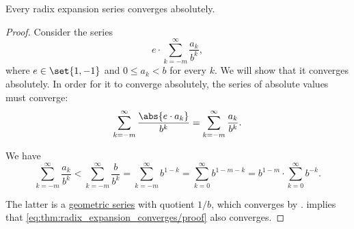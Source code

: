 \begin{proposition}\label{thm:radix_expansion_converges}
  Every radix expansion series converges absolutely.
\end{proposition}
\begin{proof}
  Consider the series
  \begin{equation}\label{eq:thm:radix_expansion_converges/proof}
    e \cdot \sum_{k=-m}^\infty \frac {a_k} {b^k},
  \end{equation}
  where \( e \in \set{ 1, -1 } \) and \( 0 \leq a_k < b \) for every \( k \). We will show that it converges absolutely. In order for it to converge absolutely, the series of absolute values must converge:
  \begin{equation}\label{eq:thm:radix_expansion_converges/absolute}
    \sum_{k=-m}^\infty \frac {\abs{e \cdot a_k}} {b^k} = \sum_{k=-m}^\infty \frac {a_k} {b^k}.
  \end{equation}

  We have
  \begin{equation*}
    \sum_{k=-m}^\infty \frac {a_k} {b^k}
    <
    \sum_{k=-m}^\infty \frac b {b^k}
    =
    \sum_{k=-m}^\infty b^{1-k}
    =
    \sum_{k=0}^\infty b^{1-m-k}
    =
    b^{1-m} \cdot \sum_{k=0}^\infty b^{-k}.
  \end{equation*}

  The latter is a \hyperref[def:geometric_series]{geometric series} with quotient \( 1 / b \), which converges by .  implies that \eqref{eq:thm:radix_expansion_converges/proof} also converges.
\end{proof}

